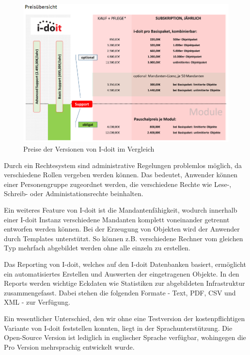\begin{figure}[htbp]
\includegraphics[width=\textwidth]{images/idoitpreis}
\caption{Preise der Versionen von I-doit im Vergleich}
\label{fig:idoitpreis}
\end{figure}

Durch ein Rechtesystem sind administrative Regelungen problemlos möglich, da verschiedene Rollen vergeben werden können.
Das bedeutet, Anwender können einer Personengruppe zugeordnet werden, die verschiedene Rechte wie Lese-, Schreib- oder Administationsrechte beinhalten.

Ein weiteres Feature von I-doit ist die Mandantenfähigkeit, wodurch innerhalb einer I-doit Instanz verschiedene Mandanten komplett voneinander getrennt entworfen werden können.
Bei der Erzeugung von Objekten wird der Anwender durch Templates unterstützt.
So können z.B. verschiedene Rechner vom gleichen Typ mehrfach abgebildet werden ohne alle einzeln zu erstellen.

Das Reporting von I-doit, welches auf den I-doit Datenbanken basiert, ermöglicht ein automatisiertes Erstellen und Auswerten der eingetragenen Objekte.
In den Reports werden wichtige Eckdaten wie Statistiken zur abgebildeten Infrastruktur zusammengefasst.
Dabei stehen die folgenden Formate - Text, PDF, CSV und XML - zur Verfügung.

Ein wesentlicher Unterschied, den wir ohne eine Testversion der kostenpflichtigen Variante von I-doit feststellen konnten, liegt in der Sprachunterstützung.
Die Open-Source Version ist lediglich in englischer Sprache verfügbar, wohingegen die Pro Version mehrsprachig entwickelt wurde.


